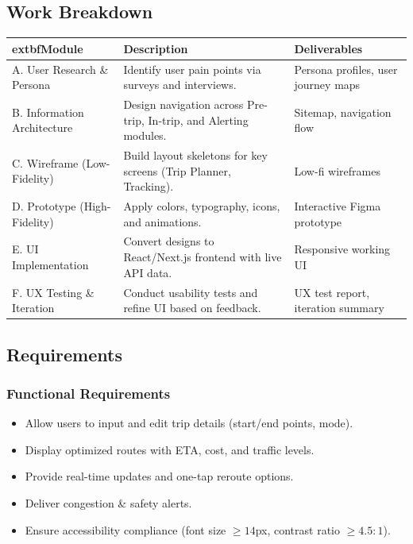 \subsection{Work Breakdown}
\renewcommand{\arraystretch}{1.12}
\begin{tabularx}{\textwidth}{|>{\raggedright\arraybackslash}p{3.3cm}|>{\raggedright\arraybackslash}X|>{\raggedright\arraybackslash}p{3.6cm}|}
\hline
	extbf{Module} & \textbf{Description} & \textbf{Deliverables} \\
\hline
A. User Research \& Persona & Identify user pain points via surveys and interviews. & Persona profiles, user journey maps \\
\hline
B. Information Architecture & Design navigation across Pre-trip, In-trip, and Alerting modules. & Sitemap, navigation flow \\
\hline
C. Wireframe (Low-Fidelity) & Build layout skeletons for key screens (Trip Planner, Tracking). & Low-fi wireframes \\
\hline
D. Prototype (High-Fidelity) & Apply colors, typography, icons, and animations. & Interactive Figma prototype \\
\hline
E. UI Implementation & Convert designs to React/Next.js frontend with live API data. & Responsive working UI \\
\hline
F. UX Testing \& Iteration & Conduct usability tests and refine UI based on feedback. & UX test report, iteration summary \\
\hline
\end{tabularx}

\subsection{Requirements}
\subsubsection{Functional Requirements}
\begin{itemize}
  \item Allow users to input and edit trip details (start/end points, mode).
  \item Display optimized routes with ETA, cost, and traffic levels.
  \item Provide real-time updates and one-tap reroute options.
  \item Deliver congestion \& safety alerts.
  \item Ensure accessibility compliance (font size $\ge 14$px, contrast ratio $\ge 4.5:1$).
\end{itemize}

